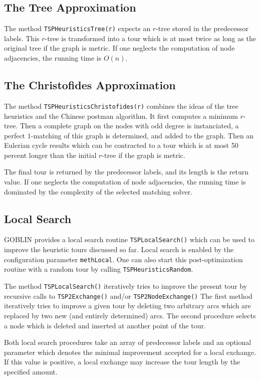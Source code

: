 \documentclass[a4paper,11pt,twoside]{book}
\begin{document}
\begin{multicols}{2}
\subsection{The Tree Approximation}
The method \verb/TSPHeuristicsTree(r)/ expects an $r$-tree stored in the
predecessor labels. This $r$-tree is transformed into a tour which is at most
twice as long as the original tree if the graph is metric. If one neglects the
computation of node adjacencies, the running time is $O(n)$.


\subsection{The Christofides Approximation}
The method \verb/TSPHeuristicsChristofides(r)/ combines the ideas of the tree
heuristics and the Chinese postman algorithm. It first computes a minimum
$r$-tree. Then a complete graph on the nodes with odd degree is instanciated,
a perfect $1$-matching of this graph is determined, and added to the graph.
Then an Eulerian cycle results which can be contracted to a tour which is at
most 50 percent longer than the initial $r$-tree if the graph is metric.

The final tour is returned by the predecessor labels, and its length is the
return value. If one neglects the computation of node adjacencies, the running
time is dominated by the complexity of the selected matching solver.


\subsection{Local Search}
GOBLIN provides a local search routine \verb/TSPLocalSearch()/ which can be used
to improve the heuristic tours discussed so far. Local search is enabled by the
configuration parameter \verb/methLocal/. One can also start this post-optimization
routine with a random tour by calling \verb/TSPHeuristicsRandom/.

The method \verb/TSPLocalSearch()/ iteratively tries to improve the present tour
by recursive calls to \verb/TSP2Exchange()/ and/or \verb/TSP2NodeExchange()/
The first method iteratively tries to improve a given tour by deleting two
arbitrary arcs which are replaced by two new (and entirely determined) arcs.
The second procedure selects a node which is deleted and inserted at another
point of the tour.

Both local search procedures take an array of predecessor labels and an optional
parameter which denotes the minimal improvement accepted for a local exchange.
If this value is positive, a local exchange may increase the tour length by the
specified amount.


\end{multicols}
\end{document}

